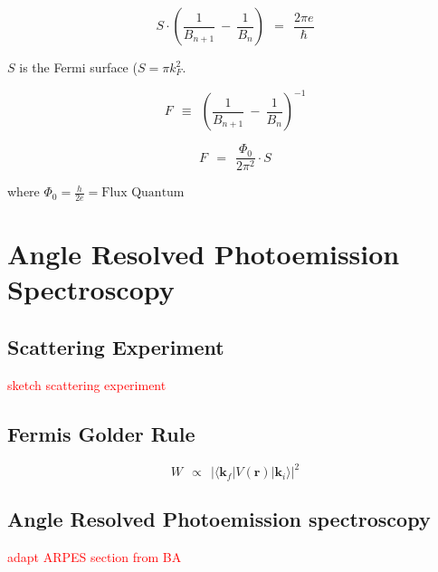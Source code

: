 \documentclass[10pt]{report}
\numberwithin{equation}{chapter}
\newcommand{\vc}[1]{ %
  \mathbf{#1}
}
\begin{document}
\begin{equation}
  S \cdot \left( \frac{1}{B_{n+1}} ~-~ \frac{1}{B_n} \right) ~~=~~ \frac{2 \pi e}{\hbar}
\end{equation}

$S$ is the Fermi surface ($S=\pi k_F^2$.

\begin{equation}
  F ~~\equiv~~ \left( \frac{1}{B_{n+1}} ~-~ \frac{1}{B_n} \right)^{-1}
\end{equation}

\begin{equation}
  F ~~=~~ \frac{\Phi_0}{2 \pi^2} \cdot S
\end{equation}

where $\Phi_0 = \frac{h}{2e} = \text{Flux Quantum}$




%
\section{Angle Resolved Photoemission Spectroscopy}

\subsection{Scattering Experiment}

\textcolor{red}{sketch scattering experiment}

\subsection{Fermis Golder Rule}

\begin{equation}
  W ~~\propto~~ | \langle \vc{k}_f | V(\vc{r}) | \vc{k}_i \rangle |^2
\end{equation}


\subsection{Angle Resolved Photoemission spectroscopy}


\textcolor{red}{adapt ARPES section from BA}
\end{document}
